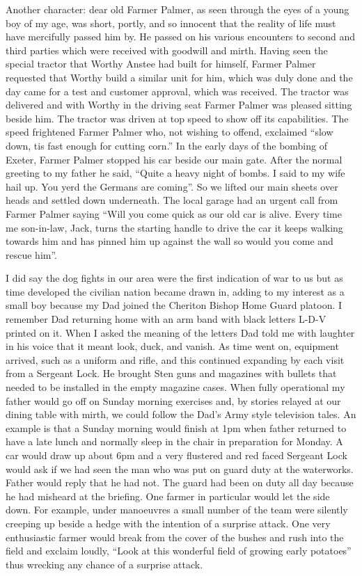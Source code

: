 Another character: dear old Farmer Palmer, as seen through the eyes of a young
boy of my age, was short, portly, and so innocent that the reality of life must
have mercifully passed him by. He passed on his various encounters to second
and third parties which were received with goodwill and mirth. Having seen the
special tractor that Worthy Anstee had built for himself, Farmer Palmer
requested that Worthy build a similar unit for him, which was duly done and the
day came for a test and customer approval, which was received. The tractor was
delivered and with Worthy in the driving seat Farmer Palmer was pleased sitting
beside him. The tractor was driven at top speed to show off its capabilities.
The speed frightened Farmer Palmer who, not wishing to offend, exclaimed ``slow
down, tis fast enough for cutting corn.'' In the early days of the bombing of
Exeter, Farmer Palmer stopped his car beside our main gate. After the normal
greeting to my father he said, ``Quite a heavy night of bombs. I said to my
wife hail up. You yerd the Germans are coming''. So we lifted our main sheets
over heads and settled down underneath. The local garage had an urgent call
from Farmer Palmer saying ``Will you come quick as our old car is alive. Every
time me son-in-law, Jack, turns the starting handle to drive the car it keeps
walking towards him and has pinned him up against the wall so would you come
and rescue him''.

I did say the dog fights in our area were the first indication of war to us but
as time developed the civilian nation became drawn in, adding to my interest as
a small boy because my Dad joined the Cheriton Bishop Home Guard platoon. I
remember Dad returning home with an arm band with black letters L-D-V printed
on it. When I asked the meaning of the letters Dad told me with laughter in his
voice that it meant look, duck, and vanish. As time went on, equipment arrived,
such as a uniform and rifle, and this continued expanding by each visit from a
Sergeant Lock. He brought Sten guns and magazines with bullets that needed to
be installed in the empty magazine cases. When fully operational my father
would go off on Sunday morning exercises and, by stories relayed at our dining
table with mirth, we could follow the Dad's Army style television tales. An
example is that a Sunday morning would finish at 1pm when father returned to
have a late lunch and normally sleep in the chair in preparation for Monday. A
car would draw up about 6pm and a very flustered and red faced Sergeant Lock
would ask if we had seen the man who was put on guard duty at the waterworks.
Father would reply that he had not. The guard had been on duty all day because
he had misheard at the briefing. One farmer in particular would let the side
down. For example, under manoeuvres a small number of the team were silently
creeping up beside a hedge with the intention of a surprise attack. One very
enthusiastic farmer would break from the cover of the bushes and rush into the
field and exclaim loudly, ``Look at this wonderful field of growing early
potatoes'' thus wrecking any chance of a surprise attack.

